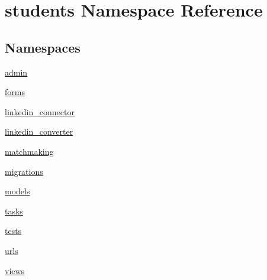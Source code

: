 \hypertarget{namespacestudents}{\section{students Namespace Reference}
\label{namespacestudents}
}
\subsection*{Namespaces}
\begin{DoxyCompactItemize}
\item 
\hyperlink{namespacestudents_1_1admin}{admin}
\item 
\hyperlink{namespacestudents_1_1forms}{forms}
\item 
\hyperlink{namespacestudents_1_1linkedin__connector}{linkedin\-\_\-connector}
\item 
\hyperlink{namespacestudents_1_1linkedin__converter}{linkedin\-\_\-converter}
\item 
\hyperlink{namespacestudents_1_1matchmaking}{matchmaking}
\item 
\hyperlink{namespacestudents_1_1migrations}{migrations}
\item 
\hyperlink{namespacestudents_1_1models}{models}
\item 
\hyperlink{namespacestudents_1_1tasks}{tasks}
\item 
\hyperlink{namespacestudents_1_1tests}{tests}
\item 
\hyperlink{namespacestudents_1_1urls}{urls}
\item 
\hyperlink{namespacestudents_1_1views}{views}
\end{DoxyCompactItemize}
